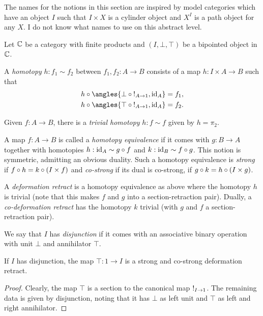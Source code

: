 \documentclass[reqno,10pt,a4paper,oneside]{amsart}
\begin{document}
The names for the notions in this section are inspired by model categories which have an object $I$ such that $I \times X$ is a cylinder object and $X^I$ is a path object for any $X$.
I do not know what names to use on this abstract level.

Let $\mathbb{C}$ be a category with finite products and $(I, \bot, \top)$ be a bipointed object in $\mathbb{C}$.

\begin{definition}
\label{def:homotopy}
A \emph{homotopy} $h : f_1 \sim f_2$ between $f_1, f_2 : A \to B$ consists of a map $h : I \times A \to B$ such that
\begin{align*}
h \cc \angles{\bot \cc \canonical_{A \to 1}, \id_A} &= f_1
,\\
h \cc \angles{\top \cc \canonical_{A \to 1}, \id_A} &= f_2
.\end{align*}

Given $f : A \to B$, there is a \emph{trivial homotopy} $h : f \sim f$ given by $h = \pi_2$. 
\end{definition}

\begin{definition}
\label{def:homotopy-equivalence}
A map $f : A \to B$ is called a \emph{homotopy equivalence} if it comes with $g : B \to A$ together with homotopies $h : \operatorname{id}_A \sim g \mathbin{\circ} f$ and $k : \operatorname{id}_B \sim f \mathbin{\circ} g$.
This notion is symmetric, admitting an obvious duality.
Such a homotopy equivalence is \emph{strong} if $f \mathbin{\circ} h = k \mathbin{\circ} (I \times f)$ and \emph{co-strong} if its dual is co-strong, \ie if $g \mathbin{\circ} k = h \mathbin{\circ} (I \times g)$.

A \emph{deformation retract} is a homotopy equivalence as above where the homotopy $h$ is trivial (note that this makes $f$ and $g$ into a section-retraction pair).
Dually, a \emph{co-deformation retract} has the homotopy $k$ trivial (with $g$ and $f$ a section-retraction pair).
\end{definition}

We say that $I$ has \emph{disjunction} if it comes with an associative binary operation with unit $\bot$ and annihilator $\top$.

\begin{example}
\label{disjunction-deformation-retract}
If $I$ has disjunction, the map $\top : 1 \to I$ is a strong and co-strong deformation retract.
\end{example}

\begin{proof}
Clearly, the map $\top$ is a section to the canonical map $\mathord{!}_{I \to 1}$.
The remaining data is given by disjunction, noting that it has $\bot$ as left unit and $\top$ as left and right annihilator.
\end{proof}
\end{document}
